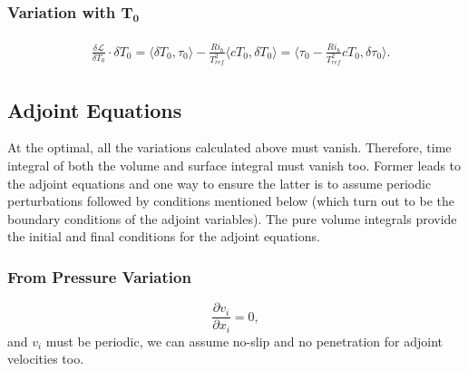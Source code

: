 \documentclass[preprint,12pt]{article}
\begin{document}
\subsubsection*{Variation with $\mathbf{T_{0}}$}
\begin{align}\begin{split}
&\frac{\delta \mathcal{L}}{\delta T_{0}}\cdot \delta T_{0}=\langle \delta T_{0},\tau_{0}\rangle-\frac{Ri_b}{T_{ref}^2}\langle cT_{0},\delta T_{0} \rangle=\langle \tau_{0}-\frac{Ri_b}{T_{ref}^2}cT_{0},\delta \tau_{0}\rangle.
\end{split}\end{align}

\subsection{Adjoint Equations}
At the optimal, all the variations calculated above must vanish. Therefore, time integral of both the volume and surface integral must vanish too. Former leads to the adjoint equations and one way to ensure the latter is to assume periodic perturbations followed by conditions mentioned below (which turn out to be the boundary conditions of the adjoint variables). The pure volume integrals provide the initial and final conditions for the adjoint equations.
\subsubsection*{From Pressure Variation}
\begin{tcolorbox}
\begin{equation}
\frac{\partial v_i }{\partial x_i}=0,
\end{equation}
and $v_i$ must be periodic, we can assume no-slip and no penetration for adjoint velocities too.
\end{tcolorbox}
\end{document}
